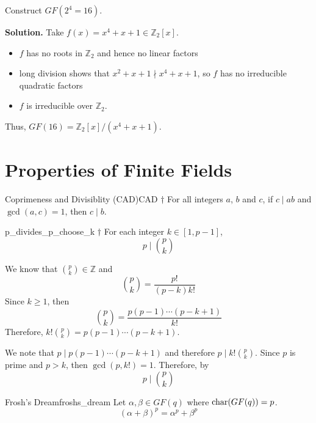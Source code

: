 
\begin{Example}{}{}
    Construct $ GF(2^4=16) $.

    \textbf{Solution.} Take $ f(x)=x^4+x+1\in\mathbb{Z}_2[x] $.
    \begin{itemize}
        \item $ f $ has no roots in $ \mathbb{Z}_2 $ and hence no linear factors
        \item long division shows that $ x^2+x+1\nmid x^4+x+1 $, so $ f $
              has no irreducible quadratic factors
        \item $ f $ is irreducible over $ \mathbb{Z}_2 $.
    \end{itemize}
    Thus, $ GF(16)=\mathbb{Z}_2[x]/(x^4+x+1) $.
\end{Example}

\section{Properties of Finite Fields}

\begin{Proposition}{Coprimeness and Divisiblity (CAD)}{CAD}
    $ \dagger $ For all integers $ a $, $ b $ and $ c $, if $ c\mid ab $
    and $ \gcd(a,c)=1 $, then $ c\mid b $.
\end{Proposition}

\begin{Lemma}{}{p_divides_p_choose_k}
    $ \dagger $ For each integer $ k\in[1,p-1] $,
    \[ p\mid \binom{p}{k} \]
\end{Lemma}

\begin{Proof}{}{}
    We know that $ \binom{p}{k}\in\mathbb{Z} $ and
    \[ \binom{p}{k}=\frac{p!}{(p-k)k!} \]
    Since $ k\geqslant 1 $, then
    \[ \binom{p}{k}=\frac{p(p-1)\cdots(p-k+1)}{k!} \]
    Therefore, $ k!\binom{p}{k}=p(p-1)\cdots(p-k+1) $.

    We note that $ p\mid p(p-1)\cdots(p-k+1) $ and therefore
    $ p\mid k!\binom{p}{k} $. Since $ p $ is prime and $ p>k $,
    then $ \gcd(p,k!)=1 $. Therefore, by~
    \[ p\mid \binom{p}{k} \]
\end{Proof}

\begin{Theorem}{Frosh's Dream}{froshs_dream}
    Let $ \alpha,\beta\in GF(q) $ where $ \operatorname{char}(GF(q))=p $.
    \[ (\alpha + \beta)^p=\alpha^p+\beta^p \]
\end{Theorem}

